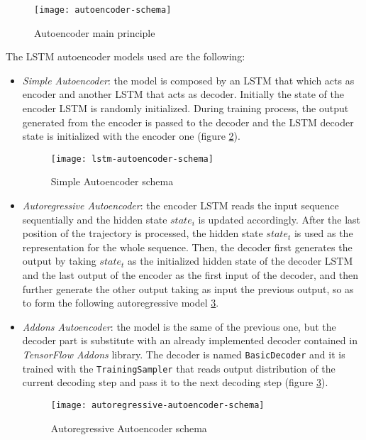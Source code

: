 \begin{figure}[bt]
	\centering
	\texttt{[image: autoencoder-schema]}
	\caption{Autoencoder main principle}
	\label{fig:autoencoder-schema}
\end{figure}

The LSTM autoencoder models used are the following:
\begin{itemize}
	\item \textit{Simple Autoencoder}: the model is composed by an LSTM that which acts as encoder and another LSTM that acts as decoder. Initially the state of the encoder LSTM is randomly initialized. During training process, the output generated from the encoder is passed to the decoder and the LSTM decoder state is initialized with the encoder one (figure \ref{fig:lstm-autoencoder-schema}). 
	
	\begin{figure}[bt]
		\centering
		\texttt{[image: lstm-autoencoder-schema]}
		\caption{Simple Autoencoder schema}
		\label{fig:lstm-autoencoder-schema}
	\end{figure}

	\item \textit{Autoregressive Autoencoder}: the encoder LSTM reads the input sequence sequentially and the hidden state $state_i$ is updated accordingly. After the last position of the trajectory is processed, the hidden state $state_t$ is used as the representation for the whole sequence. Then, the decoder first generates the output by taking $state_t$ as the initialized hidden state of the decoder LSTM and the last output of the encoder as the first input of the decoder, and then further generate the other output taking as input the previous output, so as to form the following autoregressive model \ref{fig:autoregressive-autoencoder-schema}.
	\item \textit{Addons Autoencoder}: the model is the same of the previous one, but the decoder part is substitute with an already implemented decoder contained in \textit{TensorFlow Addons} library. The decoder is named \texttt{BasicDecoder} and it is trained with the \texttt{TrainingSampler} that reads output distribution of the current decoding step and pass it to the next decoding step (figure \ref{fig:autoregressive-autoencoder-schema}).
	
	\begin{figure}[bt]
		\centering
		\texttt{[image: autoregressive-autoencoder-schema]}
		\caption{Autoregressive Autoencoder schema}
		\label{fig:autoregressive-autoencoder-schema}
	\end{figure}
\end{itemize}

